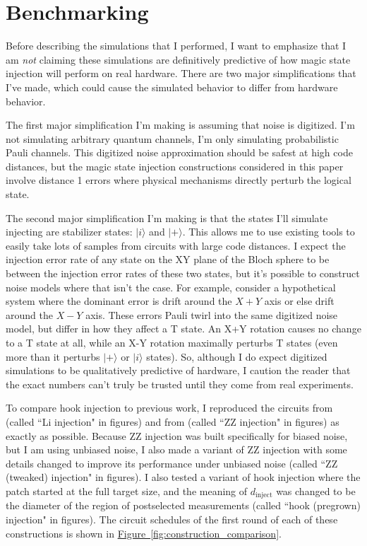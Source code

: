 \documentclass[onecolumn,unpublished,a4paper]{quantumarticle}
\theoremstyle{definition}
\theoremstyle{definition}
\theoremstyle{definition}
\newcommand{\fig}[1]{\hyperref[fig:#1]{Figure~\ref*{fig:#1}}}
\begin{document}
\section{Benchmarking}
\label{sec:benchmarking}

Before describing the simulations that I performed, I want to emphasize that I am \emph{not} claiming these simulations are definitively predictive of how magic state injection will perform on real hardware.
There are two major simplifications that I've made, which could cause the simulated behavior to differ from hardware behavior.

The first major simplification I'm making is assuming that noise is digitized.
I'm not simulating arbitrary quantum channels, I'm only simulating probabilistic Pauli channels.
This digitized noise approximation should be safest at high code distances, but the magic state injection constructions considered in this paper involve distance 1 errors where physical mechanisms directly perturb the logical state.

The second major simplification I'm making is that the states I'll simulate injecting are stabilizer states: $|i\rangle$ and $|+\rangle$.
This allows me to use existing tools to easily take lots of samples from circuits with large code distances.
I expect the injection error rate of any state on the XY plane of the Bloch sphere to be between the injection error rates of these two states, but it's possible to construct noise models where that isn't the case.
For example, consider a hypothetical system where the dominant error is drift around the $X+Y$ axis or else drift around the $X-Y$ axis. These errors Pauli twirl into the same digitized noise model, but differ in how they affect a T state.
An X+Y rotation causes no change to a T state at all, while an X-Y rotation maximally perturbs T states (even more than it perturbs $|+\rangle$ or $|i\rangle$ states).
So, although I do expect digitized simulations to be qualitatively predictive of hardware, I caution the reader that the exact numbers can't truly be trusted until they come from real experiments.

To compare hook injection to previous work, I reproduced the circuits from \cite{li2015injection} (called ``Li injection" in figures) and from \cite{singh2022injection} (called ``ZZ injection" in figures) as exactly as possible.
Because ZZ injection was built specifically for biased noise, but I am using unbiased noise, I also made a variant of ZZ injection with some details changed to improve its performance under unbiased noise (called ``ZZ (tweaked) injection" in figures).
I also tested a variant of hook injection where the patch started at the full target size, and the meaning of $d_\text{inject}$ was changed to be the diameter of the region of postselected measurements (called ``hook (pregrown) injection" in figures).
The circuit schedules of the first round of each of these constructions is shown in \fig{construction_comparison}.
\end{document}
